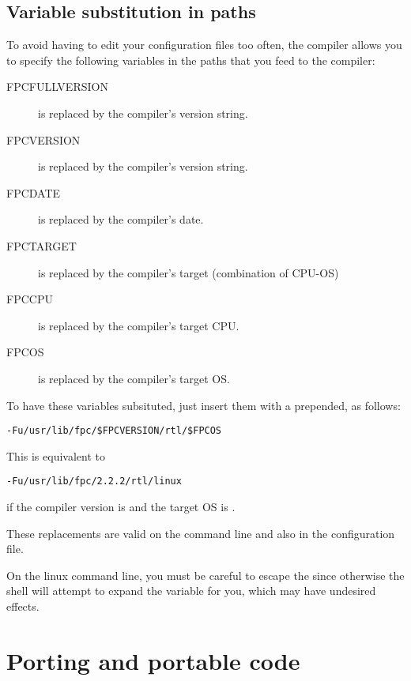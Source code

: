 \section{Variable substitution in paths}
To avoid having to edit your configuration files too often,
the compiler allows you to specify the following variables in
the paths that you feed to the compiler:
\begin{description}
\item[FPCFULLVERSION] is replaced by the compiler's version string.
\item[FPCVERSION] is replaced by the compiler's version string.
\item[FPCDATE] is replaced by the compiler's date.
\item[FPCTARGET] is replaced by the compiler's target (combination of CPU-OS)
\item[FPCCPU] is replaced by the compiler's target CPU.
\item[FPCOS] is replaced by the compiler's target OS.
\end{description}
To have these variables subsituted, just insert them with a \var{\$}
prepended, as follows:
\begin{verbatim}
-Fu/usr/lib/fpc/$FPCVERSION/rtl/$FPCOS
\end{verbatim}
This is equivalent to
\begin{verbatim}
-Fu/usr/lib/fpc/2.2.2/rtl/linux
\end{verbatim}
if the compiler version is  and the target OS is \linux{}.

These replacements are valid on the command line and also in the
configuration file.

On the linux command line, you must be careful to escape the \var{\$} since
otherwise the shell will attempt to expand the variable for you, which may have
undesired effects.





\chapter{Porting and portable code}

